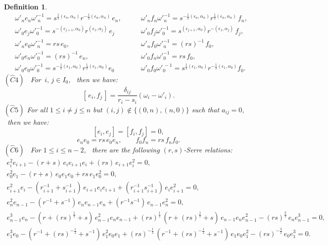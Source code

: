 \documentclass{amsproc}
\newtheorem{defi}[theo]{Definition}
\theoremstyle{remark}
\numberwithin{equation}{section}
\begin{document}
\begin{defi}
{\begin{equation*}
\begin{array}{lll}
&\omega'_n e_n{\omega'}_n^{-1}=s^{\frac{1}{2}(\epsilon_n,
\alpha_n)}r^{-\frac{1}{2}(\epsilon_n, \alpha_n)}\,e_n,~~~~~~~~~
&\omega'_nf_n{\omega'}_n^{-1}=s^{-\frac{1}{2}(\epsilon_n,
\alpha_n)}r^{\frac{1}{2}(\epsilon_n, \alpha_n)}\,f_n,\\
&\omega'_0e_j{\omega'}_0^{-1}=s^{-(\epsilon_{j+1}, \alpha_0)}
r^{(\epsilon_1, \alpha_j)}\,e_j
& \omega'_0f_j{\omega'}_0^{-1}=s^{(\epsilon_{j+1}, \alpha_0 )}
r^{-(\epsilon_1, \alpha_j)}\,f_j ,\\
&\omega'_n e_0{\omega'}_n^{-1}=rs\, e_0,~~~~~~~
&\omega'_n f_0{\omega'}_n^{-1}=(rs)^{-1}\,f_0 ,\\
&\omega'_0e_n{\omega'}_0^{-1}=(rs)^{-1}\,e_n, ~~~~~~
&\omega'_0f_n{\omega'}_0^{-1}=rs \,f_0 ,\\
&\omega'_0e_0{\omega'}_0^{-1}=s^{-\frac{1}{2}(\epsilon_1,
\alpha_0)}r^{\frac{1}{2}(\epsilon_1, \alpha_0)}e_0 ~~~~~~
&\omega'_0f_0{\omega'}_0^{\,-1}=s^{\frac{1}{2}(\epsilon_1,
\alpha_0)}r^{-\frac{1}{2}(\epsilon_1, \alpha_0)}f_0 .
\end{array}\end{equation*}
$(\hat{C}4)$ \ \textit{For} $\,i,\, j\in I_0$, \textit{~then we
have:}
 $$[\,e_i, f_j\,]=\frac{\delta_{ij}}{r_i-s_i}(\omega_i-\omega'_i).$$
$(\hat{C}5)$
  \textit{For all}  $1\leqslant i\ne j\leqslant n$ \textit{but}
  $(i, j)\not\in\{(0, n), (n, 0)\}$ \textit{such that} $a_{ij}=0$,  \textit{~then we have:}
 $$[e_i, e_j]=[f_i, f_j]=0,$$
 $$e_ne_0=rs\,e_0e_n,\qquad f_0f_n=rs\,f_nf_0.$$
$(\hat{C}6)$ \ \textit{For} $1\leqslant i\leqslant n-2$,
\textit{~there are the following }$(r,s)$-Serre \textit{relations:}
\begin{gather*}
e_i^2e_{i+1}-(r{+}s)\,e_ie_{i+1}e_i+(rs)\,e_{i+1}e_i^2=0,\\
e_0^2e_{1}-(r{+}s)\,e_0e_{1}e_0+rs\,e_{1}e_0^2=0,\\
e_{i+1}^2e_i-(r_{i+1}^{-1}{+}s_{i+1}^{-1})\,e_{i+1}e_ie_{i+1}+
(r_{i+1}^{-1}s_{i+1}^{-1})\,e_ie_{i+1}^2=0,\\
e_n^2e_{n-1}-(r^{-1}{+}s^{-1})\,e_ne_{n-1}e_n+(r^{-1}s^{-1})\,e_{n-1}e_n^2=0,\\
e_{n-1}^3e_n-(r{+}(rs)^{\frac{1}{2}}{+}s)\,e_{n-1}^2e_ne_{n-1}+(rs)^{\frac{1}{2}}\,
(r{+}(rs)^{\frac{1}{2}}{+}s)\,e_{n-1}e_ne_{n-1}^2-
(rs)^{\frac{3}{2}}\,e_ne_{n-1}^3=0,\\
e_{1}^3e_0-(r^{-1}{+}(rs)^{-\frac{1}{2}}{+}s^{-1})\,e_{1}^2e_0e_{1}+
(rs)^{-\frac{1}{2}}\,
(r^{-1}{+}(rs)^{-\frac{1}{2}}{+}s^{-1})\,e_{1}e_0e_{1}^2-
(rs)^{-\frac{3}{2}}\,e_0e_{1}^3=0.
\end{gather*}
}
\end{defi}
\end{document}
